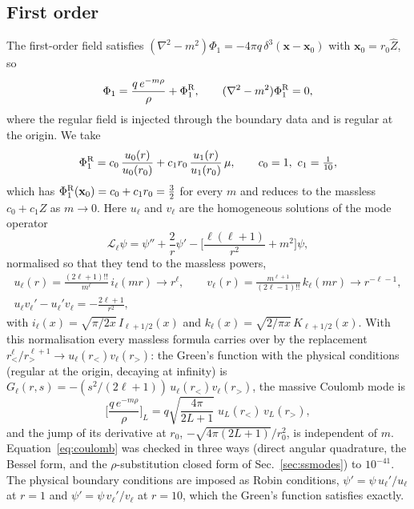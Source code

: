 \documentclass[11pt,a4paper]{article}
\newcommand{\Lop}{\mathcal{L}_\ell}
\newcommand{\x}{\mathbf{x}}
\newcommand{\PhiR}{\Phi^{\rm R}}
\begin{document}
\subsection{First order}
The first-order field satisfies $(\nabla^2-m^2)\Phi_1=-4\pi q\,\delta^3(\x-\x_0)$ with $\x_0=r_0\hat Z$, so
\begin{equation}
\Phi_1=\frac{q\,e^{-m\rho}}{\rho}+\PhiR_1,\qquad (\nabla^2-m^2)\PhiR_1=0 ,
\end{equation}
where the regular field is injected through the boundary data and is regular at the origin.
We take
\begin{equation}
\PhiR_1=c_0\,\frac{u_0(r)}{u_0(r_0)}+c_1r_0\,\frac{u_1(r)}{u_1(r_0)}\,\mu,\qquad c_0=1,\ c_1=\tfrac1{10},
\label{eq:phiR}
\end{equation}
which has $\PhiR_1(\x_0)=c_0+c_1r_0=\tfrac32$ for every $m$ and reduces to the massless $c_0+c_1Z$ as $m\to0$.
Here $u_\ell$ and $v_\ell$ are the homogeneous solutions of the mode operator
\begin{equation}
\Lop\psi=\psi''+\frac2r\psi'-\Big[\frac{\ell(\ell+1)}{r^2}+m^2\Big]\psi,
\end{equation}
normalised so that they tend to the massless powers,
\begin{gather}
u_\ell(r)=\frac{(2\ell+1)!!}{m^\ell}\,i_\ell(mr)\to r^\ell,\qquad
v_\ell(r)=\frac{m^{\ell+1}}{(2\ell-1)!!}\,k_\ell(mr)\to r^{-\ell-1},\nonumber\\
u_\ell v_\ell'-u_\ell'v_\ell=-\frac{2\ell+1}{r^2},
\label{eq:uv}
\end{gather}
with $i_\ell(x)=\sqrt{\pi/2x}\,I_{\ell+1/2}(x)$ and $k_\ell(x)=\sqrt{2/\pi x}\,K_{\ell+1/2}(x)$.
With this normalisation every massless formula carries over by the replacement $r_<^\ell/r_>^{\ell+1}\to u_\ell(r_<)v_\ell(r_>)$: the Green's function with the physical conditions (regular at the origin, decaying at infinity) is $G_\ell(r,s)=-(s^2/(2\ell+1))\,u_\ell(r_<)v_\ell(r_>)$, the massive Coulomb mode is
\begin{equation}
\Big[\frac{q\,e^{-m\rho}}{\rho}\Big]_L=q\sqrt{\frac{4\pi}{2L+1}}\;u_L(r_<)\,v_L(r_>),
\label{eq:coulomb}
\end{equation}
and the jump of its derivative at $r_0$, $-\sqrt{4\pi(2L+1)}/r_0^2$, is independent of $m$.
Equation~\eqref{eq:coulomb} was checked in three ways (direct angular quadrature, the Bessel form, and the $\rho$-substitution closed form of Sec.~\ref{sec:ssmodes}) to $10^{-41}$.
The physical boundary conditions are imposed as Robin conditions, $\psi'=\psi\,u_\ell'/u_\ell$ at $r=1$ and $\psi'=\psi\,v_\ell'/v_\ell$ at $r=10$, which the Green's function satisfies exactly.
\end{document}
